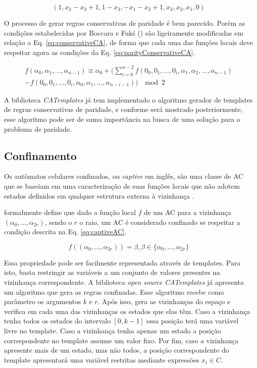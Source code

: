 \begin{equation}
(1,x_2-x_3+1,1-x_2,-x_1-x_2+1,x_3,x_2,x_1,0)
\label{eq:conservativeTemplate}
\end{equation}

O processo de gerar regras conservativas de paridade é bem parecido. Porém as condições estabelecidas por Boccara e Fukś (\citeyear{boccara2002}) são ligeiramente modificadas em relação a Eq. \eqref{eq:conservativeCA}, de forma que cada uma das funções locais deve respeitar agora as condições da Eq. \eqref{eq:parityConservativeCA}.

\begin{equation}
\begin{split}
f(\alpha_0,\alpha_1, \dots,\alpha_{n-1}) \equiv \alpha_0 + (\sum_{i=0}^{n-2}f(0_0,0_1, \dots,0_i,\alpha_1,\alpha_2, \dots,\alpha_{n-1}) \\- f(0_0,0_1, \dots,0_i,\alpha_0,\alpha_1, \dots,\alpha_{n-i-1})) \; \mod 2
\label{eq:parityConservativeCA}
\end{split}
\end{equation}

A biblioteca \textit{CATemplates} já tem implementado o algoritmo gerador de templates de regras conservativas de paridade, e conforme será mostrado posteriormente, esse algoritmo pode ser de suma importância na busca de uma solução para o problema de paridade.

\subsection{Confinamento}
Os autômatos celulares confinados, ou \textit{captive} em inglês, são uma classe de AC que se baseiam em uma caracterização de suas funções locais que não adotem estados definidos em qualquer estrutura externa à vizinhança \cite{theyssier2004captive}. 

 formalmente define que dado a função local $f$ de um AC para a vizinhança $(\alpha_0, \dots, \alpha_{2r})$, sendo o $r$ o raio, um AC é considerado confinado se respeitar a condição descrita na Eq. \eqref{eq:captiveAC}.

\begin{equation}
f((\alpha_0, \dots, \alpha_{2r})) = \beta, \beta \in \{\alpha_0, \dots, \alpha_{2r}\}
\label{eq:captiveAC}
\end{equation}

Essa propriedade pode ser facilmente representada através de templates. Para isto, basta restringir as variáveis a um conjunto de valores presentes na vizinhança correspondente. A biblioteca \textit{open source CATemplates} já apresenta um algoritmo que gera as regras confinadas. Esse algoritmo recebe como parâmetro os argumentos $k$ e $r$. Após isso, gera as vizinhanças do espaço e verifica em cada uma das vizinhanças os estados que elas têm. Caso a vizinhança tenha todos os estados do intervalo $[0, k-1]$ essa posição terá uma variável livre no template. Caso a vizinhança tenha apenas um estado a posição correspondente no template assume um valor fixo. Por fim, caso a vizinhança apresente mais de um estado, mas não todos, a posição correspondente do template apresentará uma variável restritas mediante expressões $x_i \in C$.

